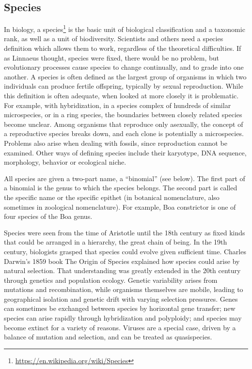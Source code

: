 \documentclass[]{book}
\let\rmarkdownfootnote\footnote%
\def\footnote{\protect\rmarkdownfootnote}
\renewcommand{\href}[2]{#2\footnote{\url{#1}}}
\theoremstyle{definition}
\theoremstyle{definition}
\theoremstyle{definition}
\theoremstyle{remark}
\begin{document}
\begin{enumerate}
\section{Species}\label{species}

In biology, a \href{https://en.wikipedia.org/wiki/Species}{species} is
the basic unit of biological classification and a taxonomic rank, as
well as a unit of biodiversity. Scientists and others need a species
definition which allows them to work, regardless of the theoretical
difficulties. If as Linnaeus thought, species were fixed, there would be
no problem, but evolutionary processes cause species to change
continually, and to grade into one another. A species is often defined
as the largest group of organisms in which two individuals can produce
fertile offspring, typically by sexual reproduction. While this
definition is often adequate, when looked at more closely it is
problematic. For example, with hybridization, in a species complex of
hundreds of similar microspecies, or in a ring species, the boundaries
between closely related species become unclear. Among organisms that
reproduce only asexually, the concept of a reproductive species breaks
down, and each clone is potentially a microspecies. Problems also arise
when dealing with fossils, since reproduction cannot be examined. Other
ways of defining species include their karyotype, DNA sequence,
morphology, behavior or ecological niche.

All species are given a two-part name, a ``binomial'' (see below). The
first part of a binomial is the genus to which the species belongs. The
second part is called the specific name or the specific epithet (in
botanical nomenclature, also sometimes in zoological nomenclature). For
example, Boa constrictor is one of four species of the Boa genus.

Species were seen from the time of Aristotle until the 18th century as
fixed kinds that could be arranged in a hierarchy, the great chain of
being. In the 19th century, biologists grasped that species could evolve
given sufficient time. Charles Darwin's 1859 book The Origin of Species
explained how species could arise by natural selection. That
understanding was greatly extended in the 20th century through genetics
and population ecology. Genetic variability arises from mutations and
recombination, while organisms themselves are mobile, leading to
geographical isolation and genetic drift with varying selection
pressures. Genes can sometimes be exchanged between species by
horizontal gene transfer; new species can arise rapidly through
hybridization and polyploidy; and species may become extinct for a
variety of reasons. Viruses are a special case, driven by a balance of
mutation and selection, and can be treated as quasispecies.


\end{enumerate}
\end{document}
